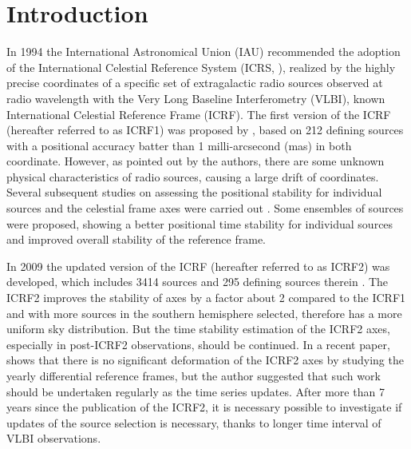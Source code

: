 \documentclass{aa}
\begin{document}
\section{Introduction}
In 1994 the International Astronomical Union (IAU) recommended the adoption of the International Celestial Reference System (ICRS, \cite{Arias1995}), realized by the highly precise coordinates of a specific set of extragalactic radio sources observed at radio wavelength with the Very Long Baseline Interferometry (VLBI), known International Celestial Reference Frame (ICRF). The first version of the ICRF (hereafter referred to as ICRF1) was proposed by \cite{ma1998}, based on 212 defining sources with a positional accuracy batter than 1 milli-arcsecond (mas) in both coordinate. However, as pointed out by the authors, there are some unknown physical characteristics of radio sources, causing a large drift of coordinates. Several subsequent studies on assessing the positional stability for individual sources and the celestial frame axes were carried out \citep[see][]{Feissel2000,AMGontier2001,FV2003,FV2006,gontier2008,Lambert2009}. Some ensembles of sources were proposed, showing a better positional time stability for individual sources and improved overall stability of the reference frame.

In 2009 the updated version of the ICRF (hereafter referred to as ICRF2) was developed, which includes 3414 sources and 295 defining sources therein \citep{2009ITN....35....1M,IERS2}. The ICRF2 improves the stability of axes by a factor about 2 compared to the ICRF1 and with more sources in the southern hemisphere selected, therefore has a more uniform sky distribution. But the time stability estimation of the ICRF2 axes, especially in post-ICRF2 observations, should be continued. In a recent paper, \citep{Lambert2013} shows that there is no significant deformation of the ICRF2 axes by studying the yearly differential reference frames, but the author suggested that such work should be undertaken regularly as the time series updates. After more than 7 years since the publication of the ICRF2, it is necessary possible to investigate if updates of the source selection is necessary, thanks to longer time interval of VLBI observations.
\end{document}
